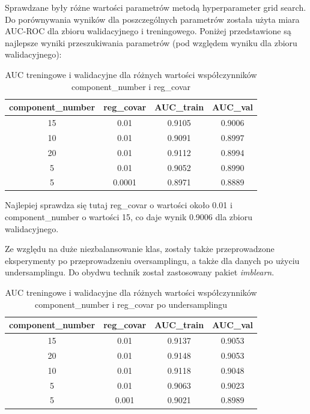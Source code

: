 \documentclass[12pt]{article}
\begin{document}
Sprawdzane były różne wartości parametrów metodą hyperparameter grid search. Do porównywania wyników dla poszczególnych parametrów została użyta miara AUC-ROC dla zbioru walidacyjnego i treningowego. Poniżej przedstawione są najlepsze wyniki przeszukiwania parametrów (pod względem wyniku dla zbioru walidacyjnego):

\begin{table}[h]
    \centering
    \begin{tabular}{|c|c|c|c|}
    \hline
        component\_number & reg\_covar & AUC\_train & AUC\_val \\ \hline
        15 & 0.01 & 0.9105 & 0.9006 \\ \hline 
        10 & 0.01 & 0.9091 & 0.8997 \\ \hline 
        20 & 0.01 & 0.9112 & 0.8994 \\ \hline 
        5 & 0.01 & 0.9052 & 0.8990 \\ \hline 
        5 & 0.0001 & 0.8971 & 0.8889 \\ \hline 
    \end{tabular}
    \caption{AUC treningowe i walidacyjne dla różnych wartości współczynników component\_number i reg\_covar}
    \label{tab:gaussian_mix_gridsearch}
\end{table}

Najlepiej sprawdza się tutaj reg\_covar o wartości około 0.01 i component\_number o wartości 15, co daje wynik 0.9006 dla zbioru walidacyjnego. 

Ze względu na duże niezbalansowanie klas, zostały także przeprowadzone eksperymenty po przeprowadzeniu oversamplingu, a także dla danych po użyciu undersamplingu. Do obydwu technik został zastosowany pakiet \textit{imblearn}.

\begin{table}[h]
    \centering
    \begin{tabular}{|c|c|c|c|}
    \hline
        component\_number & reg\_covar & AUC\_train & AUC\_val \\ \hline
        15 & 0.01 & 0.9137 & 0.9053 \\ \hline 
        20 & 0.01 & 0.9148 & 0.9053 \\ \hline 
        10 & 0.01 & 0.9118 & 0.9048 \\ \hline 
        5 & 0.01 & 0.9063 & 0.9023 \\ \hline 
        5 & 0.001 & 0.9021 & 0.8989 \\ \hline 
    \end{tabular}
    \caption{AUC treningowe i walidacyjne dla różnych wartości współczynników component\_number i reg\_covar po undersamplingu}
    \label{tab:gaussian_mix_gridsearch_undersampling}
\end{table}
\end{document}
